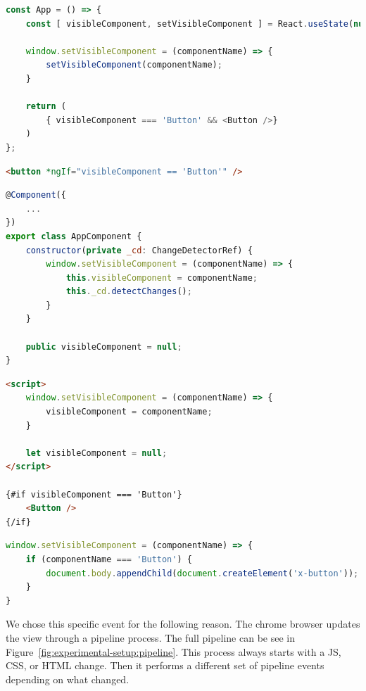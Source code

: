 \begin{lstlisting}[language={JavaScript},caption={The render-on-demand function in ReactJS},label={lst:experimental-setup:react-set-visible}]
const App = () => {
	const [ visibleComponent, setVisibleComponent ] = React.useState(null);

	window.setVisibleComponent = (componentName) => {
		setVisibleComponent(componentName);
	}

	return (
		{ visibleComponent === 'Button' && <Button />}
	)
};
\end{lstlisting}

\begin{lstlisting}[language={HTML},caption={The render-on-demand function in Angular (HTML file)},label={lst:experimental-setup:angular-set-visible-html}]
<button *ngIf="visibleComponent == 'Button'" />
\end{lstlisting}

\begin{lstlisting}[language={JavaScript},caption={The render-on-demand function in Angular (JavaScript file)},label={lst:experimental-setup:angular-set-visible-js}]
@Component({
	...
})
export class AppComponent {
	constructor(private _cd: ChangeDetectorRef) {
		window.setVisibleComponent = (componentName) => {
			this.visibleComponent = componentName;
			this._cd.detectChanges();
		}
	}

	public visibleComponent = null;
}
\end{lstlisting}

\begin{lstlisting}[language={HTML},caption={The render-on-demand function in Svelte},label={lst:experimental-setup:svelte-set-visible}]
<script>
	window.setVisibleComponent = (componentName) => {
		visibleComponent = componentName;
	}

	let visibleComponent = null;
</script>

{#if visibleComponent === 'Button'}
	<Button />
{/if}
\end{lstlisting}

\begin{lstlisting}[language={JavaScript}, caption={The render-on-demand function in Web Components},label={lst:experimental-setup:web-components-set-visible}]
window.setVisibleComponent = (componentName) => {
	if (componentName === 'Button') {
		document.body.appendChild(document.createElement('x-button'));
	}
}
\end{lstlisting}

We chose this specific event for the following reason. The chrome browser updates the view through a pipeline process. The full pipeline can be see in Figure~\ref{fig:experimental-setup:pipeline}. This process always starts with a JS, CSS, or HTML change. Then it performs a different set of pipeline events depending on what changed.

